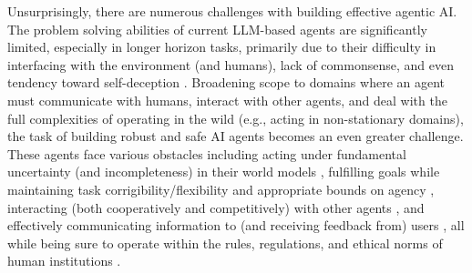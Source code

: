 \documentclass{article}
\theoremstyle{plain}
\theoremstyle{definition}
\theoremstyle{remark}
\begin{document}

Unsurprisingly, there are numerous challenges with building effective agentic AI. The problem solving abilities of current LLM-based agents are significantly limited, especially in longer horizon tasks, primarily due to their difficulty in interfacing with the environment (and humans), lack of commonsense, and even tendency toward self-deception \cite{xu2024theagentcompany}. Broadening scope to domains where an agent must communicate with humans, interact with other agents, and deal with the full complexities of operating in the wild (e.g., acting in non-stationary domains), %
the task of building robust and safe AI agents becomes an even greater challenge. These agents face various obstacles including acting under fundamental uncertainty (and incompleteness) in their world models \cite{vafa2024evaluating}, fulfilling goals while maintaining task corrigibility/flexibility and appropriate bounds on agency \cite{chan2023harms}, interacting (both cooperatively and competitively) with other agents  \cite{tran2025multi}, and effectively communicating information to (and receiving feedback from) users \cite{bansal2024challenges}, all while being sure to operate within the rules, regulations, and ethical norms of human institutions \cite{rao2023ethical, shavit2023practices, kolt2024governing}.

\end{document}
